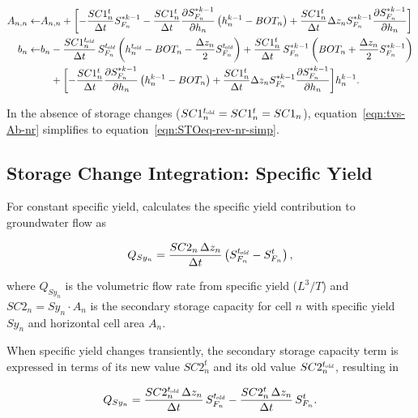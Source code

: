 \begin{equation}
	\label{eqn:tvs-Ab-nr}
	\begin{aligned}
		A_{n,n} \leftarrow & A_{n,n} + \biggl[ - \frac{SC1_n^t}{\Delta t} S_{F_n}^{\ast k-1} - \frac{SC1_n^t}{\Delta t} \frac{\partial S_{F_n}^{\ast k-1}}{\partial h_n} \left( h_n^{k-1} - BOT_n \right) + \frac{SC1_n^t}{\Delta t} \Delta z_n S_{F_n}^{\ast k-1}  \frac{\partial S_{F_n}^{\ast k-1}}{\partial h_n} \biggr] \\
		b_n \leftarrow & b_n - \frac{SC1_n^{t_\mathit{\kern -0.07em old}}}{\Delta t} \, S_{F_n}^{t_\mathit{\kern -0.07em old}} \left( h_n^{t_\mathit{\kern -0.07em old}} - BOT_n - \frac{\Delta z_n}{2} S_{F_n}^{t_\mathit{\kern -0.07em old}} \right) + \frac{SC1_n^t}{\Delta t} \, S_{F_n}^{\ast k-1} \left( BOT_n + \frac{\Delta z_n}{2} S_{F_n}^{\ast k-1} \right) \\
		& \phantom{b_n} + \biggl[ - \frac{SC1_n^t}{\Delta t} \frac{\partial S_{F_n}^{\ast k-1}}{\partial h_n} \left( h_n^{k-1} - BOT_n \right) + \frac{SC1_n^t}{\Delta t} \Delta z_n S_{F_n}^{\ast k-1}  \frac{\partial S_{F_n}^{\ast k-1}}{\partial h_n} \biggr] h_n^{k-1} .
	\end{aligned}
\end{equation}

\noindent In the absence of storage changes ($SC1_n^{t_\mathit{\kern -0.07em old}} = SC1_n^t = SC1_n$), equation~\ref{eqn:tvs-Ab-nr} simplifies to equation~\ref{eqn:STOeq-rev-nr-simp}.



\subsection{Storage Change Integration: Specific Yield} \label{sec:sci-sy}

For constant specific yield, \mf calculates the specific yield contribution to groundwater flow \citep[eq. 5--10]{modflow6gwf} as

\begin{equation}
	\label{eqn:tvs-qsy-original}
	Q_{Sy_n} = \frac{SC2_n \, \Delta z_n}{\Delta t} \left( S_{F_n}^{t_\mathit{\kern -0.07em old}} - S_{F_n}^t \right) ,
\end{equation}

\noindent where $Q_{Sy_n}$ is the volumetric flow rate from specific yield ($L^3/T$) and $SC2_n = Sy_n \cdot A_n$ is the secondary storage capacity for cell $n$ with specific yield $Sy_n$ and horizontal cell area $A_n$.

When specific yield changes transiently, the secondary storage capacity term is expressed in terms of its new value $SC2_n^t$ and its old value $SC2_n^{t_\mathit{\kern -0.07em old}}$, resulting in

\begin{equation}
	\label{eqn:tvs-qsy-new}
	Q_{Sy_n} = \frac{SC2_n^{t_\mathit{\kern -0.07em old}} \, \Delta z_n}{\Delta t} \, S_{F_n}^{t_\mathit{\kern -0.07em old}} - \frac{SC2_n^t \, \Delta z_n}{\Delta t} \, S_{F_n}^t .
\end{equation}


